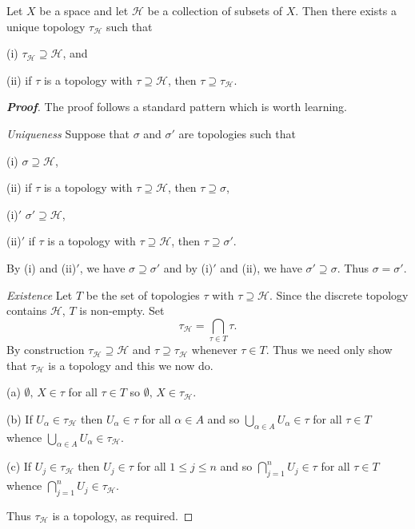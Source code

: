 \begin{lemma}\label{L;coarsest topology} 
Let $X$ be a space and let ${\mathcal H}$ be a
collection of subsets of $X$. Then there exists a unique topology
$\tau_{{\mathcal H}}$ such that 

(i) $\tau_{{\mathcal H}}\supseteq{\mathcal H}$, and

(ii) if $\tau$ is a topology with $\tau\supseteq {\mathcal H}$,
then $\tau\supseteq \tau_{{\mathcal H}}$.
\end{lemma}
\begin{proof}[\bf Proof] The proof follows a standard pattern which is
worth learning.

\noindent\emph{Uniqueness} Suppose that $\sigma$ and $\sigma'$ are topologies
such that

(i) $\sigma\supseteq{\mathcal H}$,

(ii) if $\tau$ is a topology with $\tau\supseteq {\mathcal H}$,
then $\tau\supseteq \sigma$,

(i)$'$ $\sigma'\supseteq{\mathcal H}$,

(ii)$'$ if $\tau$ is a topology with $\tau\supseteq {\mathcal H}$,
then $\tau\supseteq \sigma'$.

\noindent By (i) and (ii)$'$, we have $\sigma\supseteq \sigma'$
and by (i)$'$ and (ii), we have $\sigma'\supseteq \sigma$.
Thus $\sigma=\sigma'$.

\noindent\emph{Existence} Let $T$ be the set of topologies
$\tau$ with $\tau\supseteq {\mathcal H}$. Since the discrete
topology contains ${\mathcal H}$, $T$ is non-empty.
Set 
\[\tau_{\mathcal H}=\bigcap_{\tau\in T}\tau.\]
By construction $\tau_{\mathcal H}\supseteq{\mathcal H}$ and
$\tau\supseteq \tau_{\mathcal H}$ whenever $\tau\in T$.
Thus we need only show that $\tau_{\mathcal H}$ is a topology
and this we now do.

(a) ${\emptyset},\,X\in\tau$ for all $\tau\in T$ so ${\emptyset},\,X\in\tau_{\mathcal H}$.

(b) If $U_{\alpha}\in \tau_{\mathcal H}$ then $U_{\alpha}\in\tau$ for all $\alpha\in A$ and so  $\bigcup_{\alpha\in A}U_{\alpha}\in\tau$ for all $\tau\in T$ whence $\bigcup_{\alpha\in A}U_{\alpha}\in \tau_{\mathcal H}$.

(c) If $U_{j}\in \tau_{\mathcal H}$ then $U_{j}\in\tau$ for all $1\leq j\leq n$ and so $\bigcap_{j=1}^{n}U_{j}\in\tau$ for all $\tau\in T$ whence
$\bigcap_{j=1}^{n} U_{j}\in \tau_{\mathcal H}$.

Thus $\tau_{\mathcal H}$ is a topology, as required. 
\end{proof}


